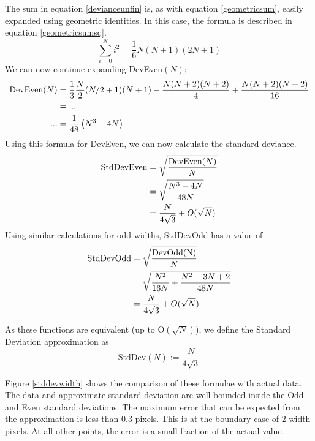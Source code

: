 \documentclass[../main.tex]{subfiles}
\begin{document}
    The sum in equation \ref{devianceunfin} is, as with equation \ref{geometricsum}, easily expanded using geometric identities.
    In this case, the formula is described in equation \ref{geometricsumsq}.
    \begin{equation}
      \sum_{i=0}^N i^2 = \frac{1}{6}N(N+1)(2N+1)
      \label{geometricsumsq}
    \end{equation}
    We can now continue expanding DevEven$(N)$;
    \begin{align}
      \text{DevEven}(N) &= \frac{1}{3}\frac{N}{2}(N/2+1)(N+1) - \frac{N(N+2)(N+2)}{4}+\frac{N(N+2)(N+2)}{16}\notag\\
        &=...\notag\\
     ...&=\frac{1}{48}\left(N^3-4N\right)
    \end{align}
    Using this formula for DevEven, we can now calculate the standard deviance.
    \begin{align}
      \text{StdDevEven}&=\sqrt{\frac{\text{DevEven}(N)}{N}}\notag\\
        &=\sqrt{\frac{N^3-4N}{48N}}\notag\\
        &=\frac{N}{4\sqrt{3}}+O(\sqrt{N})
      \label{evenstddev}
    \end{align}
    Using similar calculations for odd widths, StdDevOdd has a value of
    \begin{align}
      \text{StdDevOdd}&=\sqrt{\frac{\text{DevOdd(N)}}{N}}\notag\\
        &=\sqrt{\frac{N^2}{16N}+\frac{N^2-3N+2}{48N}}\notag\\
        &=\frac{N}{4\sqrt{3}}+O(\sqrt{N})
      \label{oddstddev}
    \end{align}
  
    As these functions are equivalent (up to O$(\sqrt{N})$), we define the Standard Deviation approximation as
    \begin{equation}
      \text{StdDev}(N):=\frac{N}{4\sqrt{3}}
      \label{stddevapprox}
    \end{equation}

    Figure \ref{stddevwidth} shows the comparison of these formulae with actual data.
    The data and approximate standard deviation are well bounded inside the Odd and Even standard deviations.
    The maximum error that can be expected from the approximation is less than 0.3 pixels.
    This is at the boundary case of 2 width pixels.
    At all other points, the error is a small fraction of the actual value.
\end{document}
